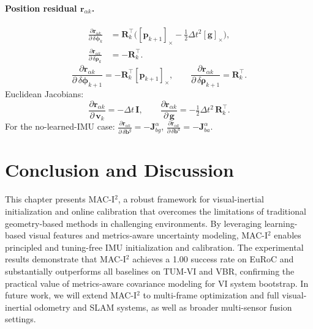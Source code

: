\paragraph{Position residual $\mathbf{r}_{\alpha k}$.}
\begin{equation}
\begin{aligned}
\frac{\partial \mathbf{r}_{\alpha k}}{\partial\,\delta\boldsymbol{\phi}_k}
&=
\mathbf{R}_k^\top\Big([\mathbf{p}_{k+1}]_\times-\tfrac12\Delta t^2[\mathbf{g}]_\times\Big),\\
\frac{\partial \mathbf{r}_{\alpha k}}{\partial\,\delta\boldsymbol{\rho}_k}
&=
-\mathbf{R}_k^\top.
\end{aligned}
\end{equation}
\begin{equation}
\frac{\partial \mathbf{r}_{\alpha k}}{\partial\,\delta\boldsymbol{\phi}_{k+1}}
=
-\mathbf{R}_k^\top[\mathbf{p}_{k+1}]_\times,
\qquad
\frac{\partial \mathbf{r}_{\alpha k}}{\partial\,\delta\boldsymbol{\rho}_{k+1}}
=
\mathbf{R}_k^\top.
\end{equation}
Euclidean Jacobians:
\begin{equation}
\frac{\partial \mathbf{r}_{\alpha k}}{\partial\,\mathbf{v}_k}=-\Delta t\,\mathbf{I},
\qquad
\frac{\partial \mathbf{r}_{\alpha k}}{\partial\,\mathbf{g}}=-\tfrac12\Delta t^2\,\mathbf{R}_k^\top.
\end{equation}
For the no-learned-IMU case:
$\frac{\partial \mathbf{r}_{\alpha k}}{\partial\,\delta\mathbf{b}^g}=-\mathbf{J}_{bg}^\alpha$,
$\frac{\partial \mathbf{r}_{\alpha k}}{\partial\,\delta\mathbf{b}^a}=-\mathbf{J}_{ba}^\alpha$.


\fi
\section{Conclusion and Discussion}
\label{sec:maci2:conclusion}

This chapter presents MAC-I$^2$, a robust framework for visual-inertial initialization and online calibration that overcomes the limitations of traditional geometry-based methods in challenging environments. By leveraging learning-based visual features and metrics-aware uncertainty modeling, MAC-I$^2$ enables principled and tuning-free IMU initialization and calibration. The experimental results demonstrate that MAC-I$^2$ achieves a 1.00 success rate on EuRoC and substantially outperforms all baselines on TUM-VI and VBR, confirming the practical value of metrics-aware covariance modeling for VI system bootstrap. In future work, we will extend MAC-I$^2$ to multi-frame optimization and full visual-inertial odometry and SLAM systems, as well as broader multi-sensor fusion settings.

